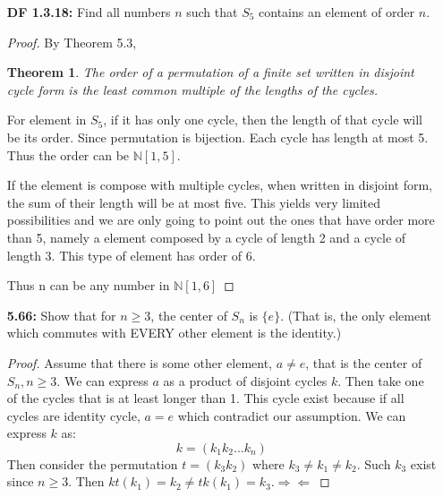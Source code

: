 \documentclass[11pt, oneside]{article}
\newcommand{\N}{\mathbb N}
\newcommand{\Z}{\mathbb Z}
\newtheorem*{theorem}{Theorem}
\begin{document}
\begin{enumerate}
\begin{proof}
By previous knowledge, we know $\Z/10\Z$ = $\langle 1\rangle$ and $|1|=10$. By Theorem 4.2 in book we aim to find k such that:
\[\langle 1^k \rangle= \langle 1^{\text{gcd}(10,k)} \rangle = \langle 1^1\rangle\]
ie. k that are relative prime to 10 which are $\{3, 7, 9\}$.

\end{proof}
\newpage
\item[{\bf DF 1.3.18:}] Find all numbers $n$ such that $S_5$ contains an element of order $n$. 
\begin{proof}
By Theorem 5.3, 
\begin{theorem}
  The order of a permutation of a finite set written in disjoint cycle form is the least common multiple of the lengths of the cycles.
\end{theorem}
For element in $S_5$, if it has only one cycle, then the length of that cycle will be its order. Since permutation is bijection. Each cycle has length at most 5. Thus the order can be $\N[1,5]$.

If the element is compose with multiple cycles, when written in disjoint form, the sum of their length will be at most five. This yields very limited possibilities and we are only going to point out the ones that have order more than 5, namely a element composed by a cycle of length 2 and a cycle of length 3. This type of element has order of 6. 

Thus n can be any number in $\N[1,6]$

\end{proof}
\newpage
\item[{\bf 5.66:}] Show that for $n\geq 3$, the center of $S_n$ is $\{e\}$. (That is, the only element which commutes with EVERY other element is the identity.)

\begin{proof}
Assume that there is some other element, $a\neq e$, that is the center of $S_n, n\geq 3$. We can express $a$ as a product of disjoint cycles $k$. Then take one of the cycles that is at least longer than 1. This cycle exist because if all cycles are identity cycle, $a=e$ which contradict our assumption. We can express $k$ as:
\[k=(k_1 k_2 ...k_n) \]
Then consider the permutation $t=(k_3k_2)$ where $k_3 \neq k_1\neq k_2$. Such $k_3$ exist since $n\geq3$. Then $kt(k_1)=k_2\neq tk(k_1)=k_3. \Rightarrow\Leftarrow$ 
\end{proof}
 

\end{enumerate}
\end{document}
